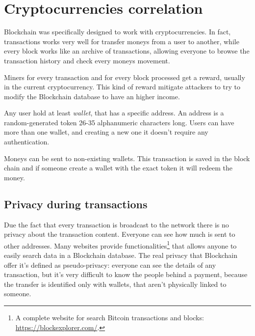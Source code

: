 \section{Cryptocurrencies correlation}

Blockchain was specifically designed to work with cryptocurrencies. In fact,
transactions works very well for transfer moneys from a user to another, while
every block works like an archive of transactions, allowing everyone to browse
the transaction history and check every moneys movement.

Miners for every transaction and for every block processed get a reward,
usually in the current cryptocurrency. This kind of reward mitigate attackers to
try to modify the Blockchain database to have an higher income.

Any user hold at least \textit{wallet}, that has a specific address. An
address is a random-generated token 26-35 alphanumeric characters long. Users
can have more than one wallet, and creating a new one it doesn't require any
authentication.

Moneys can be sent to non-existing wallets. This transaction is saved in the
block chain and if someone create a wallet with the exact token it will redeem
the money.

\subsection{Privacy during transactions}

Due the fact that every transaction is broadcast to the network there is no
privacy about the transaction content. Everyone can see how much is sent to
other addresses. Many websites provide functionalities\footnote{A complete
website for search Bitcoin transactions and blocks:
\url{https://blockexplorer.com/}.} that allows anyone to easily search data in a
Blockchain database. The real privacy that Blockchain offer it's defined as
pseudo-privacy: everyone can see the details of any transaction, but it's very
difficult to know the people behind a payment, because the transfer is
identified only with wallets, that aren't physically linked to someone.
